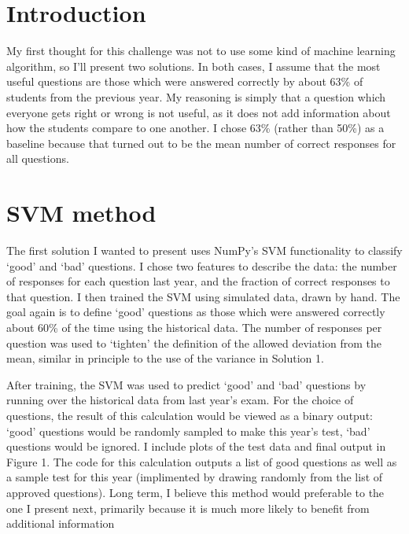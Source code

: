\documentclass[twoside,11pt, letter]{article}
\newcommand{\1}[1]{\, \mathrm{#1}} %
\begin{document}
\section{Introduction}
My first thought for this challenge was not to use some kind of machine learning algorithm, so I'll present two solutions.  
In both cases, I assume that the most useful questions are those which were answered correctly by about 63\% of students from the previous year.  
My reasoning is simply that a question which everyone gets right or wrong is not useful, as it does not add information about how the students compare to one another.
I chose 63\% (rather than 50\%) as a baseline because that turned out to be the mean number of correct responses for all questions.

\section{SVM method}
The first solution I wanted to present uses NumPy's SVM functionality to classify `good' and `bad' questions.
I chose two features to describe the data: the number of responses for each question last year, and the fraction of correct responses to that question.
I then trained the SVM using simulated data, drawn by hand.
The goal again is to define `good' questions as those which were answered correctly about 60\% of the time using the historical data.
The number of responses per question was used to `tighten' the definition of the allowed deviation from the mean, similar in principle to the use of the variance in Solution 1.

After training, the SVM was used to predict `good' and `bad' questions by running over the historical data from last year's exam.
For the choice of questions, the result of this calculation would be viewed as a binary output: `good' questions would be randomly sampled to make this year's test, `bad' questions would be ignored.
I include plots of the test data and final output in Figure 1.
The code for this calculation outputs a list of good questions as well as a sample test for this year (implimented by drawing randomly from the list of approved questions).
Long term, I believe this method would preferable to the one I present next, primarily because it is much more likely to benefit from additional information
\end{document}
